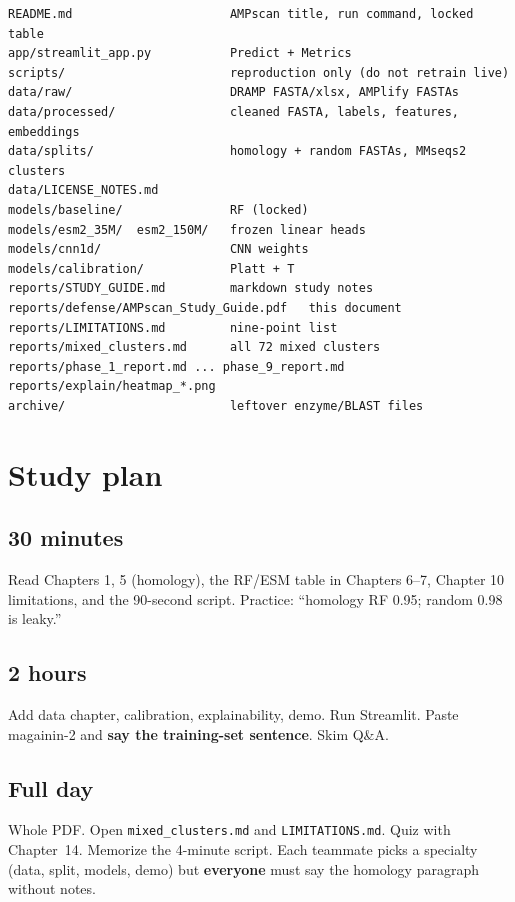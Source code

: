\documentclass[11pt,a4paper]{report}
\begin{document}
\begin{verbatim}
README.md                      AMPscan title, run command, locked table
app/streamlit_app.py           Predict + Metrics
scripts/                       reproduction only (do not retrain live)
data/raw/                      DRAMP FASTA/xlsx, AMPlify FASTAs
data/processed/                cleaned FASTA, labels, features, embeddings
data/splits/                   homology + random FASTAs, MMseqs2 clusters
data/LICENSE_NOTES.md
models/baseline/               RF (locked)
models/esm2_35M/  esm2_150M/   frozen linear heads
models/cnn1d/                  CNN weights
models/calibration/            Platt + T
reports/STUDY_GUIDE.md         markdown study notes
reports/defense/AMPscan_Study_Guide.pdf   this document
reports/LIMITATIONS.md         nine-point list
reports/mixed_clusters.md      all 72 mixed clusters
reports/phase_1_report.md ... phase_9_report.md
reports/explain/heatmap_*.png
archive/                       leftover enzyme/BLAST files
\end{verbatim}

\chapter{Study plan}
\label{ch:plan}

\section{30 minutes}

Read Chapters 1, 5 (homology), the RF/ESM table in Chapters 6--7, Chapter 10 limitations, and the 90-second script. Practice: ``homology RF 0.95; random 0.98 is leaky.''

\section{2 hours}

Add data chapter, calibration, explainability, demo. Run Streamlit. Paste magainin-2 and \textbf{say the training-set sentence}. Skim Q\&A.

\section{Full day}

Whole PDF. Open \texttt{mixed\_clusters.md} and \texttt{LIMITATIONS.md}. Quiz with Chapter~14. Memorize the 4-minute script. Each teammate picks a specialty (data, split, models, demo) but \textbf{everyone} must say the homology paragraph without notes.
\end{document}
